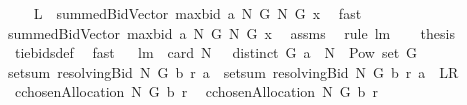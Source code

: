 \begin{isabellebody}
%
\isadelimproof
%
\endisadelimproof
%
\isatagproof
{}\isamarkupfalse%
\ {\isacharminus}\ \isanewline
{}\isamarkupfalse%
\ {\isachardoublequoteopen}{\isacharquery}L\ {\isacharequal}\ summedBidVector{\isacharprime}\ {\isacharparenleft}maxbid{\isacharprime}\ a\ N\ G{\isacharparenright}\ N\ G\ x{\isachardoublequoteclose}\ \isamarkupfalse%
\ fast\ \isamarkupfalse%
\ \isamarkupfalse%
\ {\isachardoublequoteopen}{\isachardot}{\isachardot}{\isachardot}{\isacharequal}\ \isanewline
summedBidVector\ {\isacharparenleft}maxbid\ a\ N\ G{\isacharparenright}\ N\ G\ x{\isachardoublequoteclose}\ \isamarkupfalse%
\ assms\ \isamarkupfalse%
\ {\isacharparenleft}rule\ lm{}{}{\isacharparenright}\ \isamarkupfalse%
\ \isamarkupfalse%
\ {\isacharquery}thesis\ \isanewline
{}\isamarkupfalse%
\ tiebids{\isacharunderscore}def\ \isamarkupfalse%
\ fast\isanewline
{}\isamarkupfalse%
%
\endisatagproof
{\isafoldproof}%
%
\isadelimproof
\ \isanewline
%
\endisadelimproof
\isanewline
{}\isamarkupfalse%
\ lm{}{}{\isacharcolon}\ \ {\isachardoublequoteopen}card\ N\ {\isachargreater}\ {}{\isachardoublequoteclose}\ {\isachardoublequoteopen}distinct\ G{\isachardoublequoteclose}\ {\isachardoublequoteopen}a\ {\isasymsubseteq}\ {\isacharparenleft}N\ {\isasymtimes}\ {\isacharparenleft}Pow\ {\isacharparenleft}set\ G{\isacharparenright}\ {\isacharminus}\ {\isacharbraceleft}{\isacharbraceleft}{\isacharbraceright}{\isacharbraceright}{\isacharparenright}{\isacharparenright}{\isachardoublequoteclose}\ \isanewline
{\isachardoublequoteopen}setsum\ {\isacharparenleft}resolvingBid{\isacharprime}\ N\ G\ b\ r{\isacharparenright}\ a\ {\isacharequal}\ setsum\ {\isacharparenleft}resolvingBid\ N\ G\ b\ r{\isacharparenright}\ a{\isachardoublequoteclose}\ {\isacharparenleft}\ {\isachardoublequoteopen}{\isacharquery}L{\isacharequal}{\isacharquery}R{\isachardoublequoteclose}{\isacharparenright}\ \isanewline
%
\isadelimproof
\isanewline
%
\endisadelimproof
%
\isatagproof
{}\isamarkupfalse%
\ {\isacharminus}\ \isanewline
{}\isamarkupfalse%
\ {\isacharquery}c{\isacharprime}{\isacharequal}{\isachardoublequoteopen}chosenAllocation{\isacharprime}\ N\ G\ b\ r{\isachardoublequoteclose}\ \isamarkupfalse%
\ {\isacharquery}c{\isacharequal}{\isachardoublequoteopen}chosenAllocation\ N\ G\ b\ r{\isachardoublequoteclose}\ \isamarkupfalse%

\end{isabellebody}
